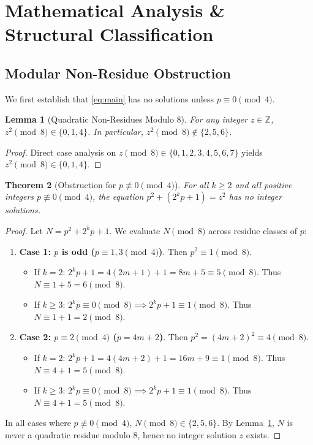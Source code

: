 \documentclass[11pt,a4paper]{article}
\newtheorem{theorem}{Theorem}
\newtheorem{lemma}[theorem]{Lemma}
\begin{document}
\section{Mathematical Analysis \& Structural Classification}

\subsection{Modular Non-Residue Obstruction}
We first establish that \eqref{eq:main} has no solutions unless $p \equiv 0 \pmod 4$.

\begin{lemma}[Quadratic Non-Residues Modulo 8] \label{lem:mod8}
For any integer $z \in \mathbb{Z}$, $z^2 \pmod 8 \in \{0, 1, 4\}$. In particular, $z^2 \pmod 8 \not\in \{2, 5, 6\}$.
\end{lemma}
\begin{proof}
Direct case analysis on $z \pmod 8 \in \{0, 1, 2, 3, 4, 5, 6, 7\}$ yields $z^2 \pmod 8 \in \{0, 1, 4\}$.
\end{proof}

\begin{theorem}[Obstruction for $p \not\equiv 0 \pmod 4$] \label{thm:mod8_obstruction}
For all $k \ge 2$ and all positive integers $p \not\equiv 0 \pmod 4$, the equation $p^2 + (2^k p + 1) = z^2$ has no integer solutions.
\end{theorem}
\begin{proof}
Let $N = p^2 + 2^k p + 1$. We evaluate $N \pmod 8$ across residue classes of $p$:
\begin{enumerate}
  \item \textbf{Case 1: $p$ is odd ($p \equiv 1, 3 \pmod 4$)}. Then $p^2 \equiv 1 \pmod 8$.
  \begin{itemize}
    \item If $k = 2$: $2^k p + 1 = 4(2m+1) + 1 = 8m + 5 \equiv 5 \pmod 8$. Thus $N \equiv 1 + 5 = 6 \pmod 8$.
    \item If $k \ge 3$: $2^k p \equiv 0 \pmod 8 \implies 2^k p + 1 \equiv 1 \pmod 8$. Thus $N \equiv 1 + 1 = 2 \pmod 8$.
  \end{itemize}
  \item \textbf{Case 2: $p \equiv 2 \pmod 4$ ($p = 4m+2$)}. Then $p^2 = (4m+2)^2 \equiv 4 \pmod 8$.
  \begin{itemize}
    \item If $k = 2$: $2^k p + 1 = 4(4m+2) + 1 = 16m + 9 \equiv 1 \pmod 8$. Thus $N \equiv 4 + 1 = 5 \pmod 8$.
    \item If $k \ge 3$: $2^k p \equiv 0 \pmod 8 \implies 2^k p + 1 \equiv 1 \pmod 8$. Thus $N \equiv 4 + 1 = 5 \pmod 8$.
  \end{itemize}
\end{enumerate}
In all cases where $p \not\equiv 0 \pmod 4$, $N \pmod 8 \in \{2, 5, 6\}$. By Lemma~\ref{lem:mod8}, $N$ is never a quadratic residue modulo 8, hence no integer solution $z$ exists.
\end{proof}
\end{document}
